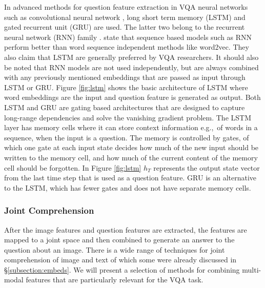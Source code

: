 \documentclass{article}
\begin{document}
In advanced methods for question feature extraction in VQA neural networks such as convolutional neural network \citep{krizhevsky2012imagenet}, long short term memory (LSTM) \citep{lstm} and gated recurrent unit (GRU) \citep{cho2014gru} are used. The latter two belong to the recurrent neural network (RNN) family \citep{elman1990finding}. \citet{young2018recent} state that sequence based models such as RNN perform better than word sequence independent methods like word2vec. They also claim that LSTM are generally preferred by VQA researchers. It should also be noted that RNN models are not used independently, but are always combined with any previously mentioned embeddings that are passed as input through LSTM or GRU. Figure \ref{fig:lstm} shows the basic architecture of LSTM where word embeddings are the input and question feature is generated as output. Both LSTM and GRU are gating based architectures that are designed to capture long-range dependencies and solve the vanishing gradient problem. The LSTM layer has memory cells where it can store context information e.g.,\ of words in a sequence, when the input is a question. The memory is controlled by gates, of which one gate at each input state decides how much of the new input should be written to the memory cell, and how much of the current content of the memory cell should be forgotten. In Figure \ref{fig:lstm} $h_T$ represents the output state vector from the last time step that is used as a question feature. GRU is an alternative to the LSTM, which has fewer gates and does not have separate memory cells.

\subsubsection{Joint Comprehension} \label{subsubsection:attention}

After the image features and question features are extracted, the features are mapped to a joint space and then combined to generate an answer to the question about an image. There is a wide range of techniques for joint comprehension of image and text of which some were already discussed in \S \ref{subsection:embeds}. We will present a selection of methods for combining multi-modal features that are particularly relevant for the VQA task.
\end{document}
